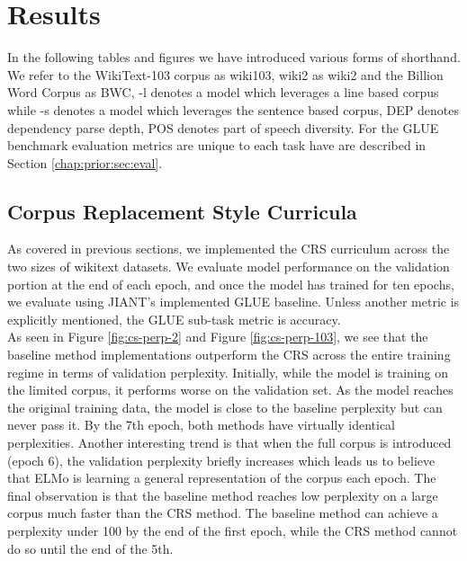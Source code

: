 \chapter{Results}
\label{chap:results}
In the following tables and figures we have introduced various forms of shorthand. We refer to the WikiText-103 corpus as wiki103, wiki2 as wiki2 and the Billion Word Corpus as BWC, -l denotes a model which leverages a line based corpus while -s denotes a model which leverages the sentence based corpus, DEP denotes dependency parse depth, POS denotes part of speech diversity. For the GLUE benchmark evaluation metrics are unique to each task have are described in Section \ref{chap:prior:sec:eval}. 
\section{Corpus Replacement Style Curricula}
\label{chap:results:secBS}
As covered in previous sections, we implemented the CRS curriculum across the two sizes of wikitext datasets. We evaluate model performance on the validation portion at the end of each epoch, and once the model has trained for ten epochs, we evaluate using JIANT's \cite{Pruksachatkun2020jiantAS} implemented GLUE baseline. Unless another metric is explicitly mentioned, the GLUE sub-task metric is accuracy. \\
As seen in Figure \ref{fig:cs-perp-2} and Figure \ref{fig:cs-perp-103}, we see that the baseline method implementations outperform the CRS across the entire training regime in terms of validation perplexity. Initially, while the model is training on the limited corpus, it performs worse on the validation set. As the model reaches the original training data, the model is close to the baseline perplexity but can never pass it. By the 7th epoch, both methods have virtually identical perplexities. Another interesting trend is that when the full corpus is introduced (epoch 6), the validation perplexity briefly increases which leads us to believe that ELMo is learning a general representation of the corpus each epoch. The final observation is that the baseline method reaches low perplexity on a large corpus much faster than the CRS method. The baseline method can achieve a perplexity under 100 by the end of the first epoch, while the CRS method cannot do so until the end of the 5th. \\
